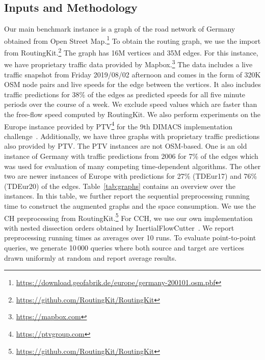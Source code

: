 \documentclass[manuscript,review]{acmart}
\begin{document}
\subsection{Inputs and Methodology}
Our main benchmark instance is a graph of the road network of Germany obtained from Open Street Map.\footnote{\url{https://download.geofabrik.de/europe/germany-200101.osm.pbf}}
To obtain the routing graph, we use the import from RoutingKit.\footnote{\url{https://github.com/RoutingKit/RoutingKit}}
The graph has 16M vertices and 35M edges.
For this instance, we have proprietary traffic data provided by Mapbox.\footnote{\url{https://mapbox.com}}
The data includes a live traffic snapshot from Friday 2019/08/02 afternoon and comes in the form of 320K OSM node pairs and live speeds for the edge between the vertices.
It also includes traffic predictions for 38\% of the edges as predicted speeds for all five minute periods over the course of a week.
We exclude speed values which are faster than the free-flow speed computed by RoutingKit.
We also perform experiments on the Europe instance provided by PTV\footnote{\url{https://ptvgroup.com}} for the 9th DIMACS implementation challenge~\cite{DemetrescuGJ09}.
Additionally, we have three graphs with proprietary traffic predictions also provided by PTV.
The PTV instances are not OSM-based.
One is an old instance of Germany with traffic predictions from 2006 for 7\% of the edges which was used for evaluation of many competing time-dependent algorithms.
The other two are newer instances of Europe with predictions for 27\% (TDEur17) and 76\% (TDEur20) of the edges.
Table~\ref{tab:graphs} contains an overview over the instances.
In this table, we further report the sequential preprocessing running time to construct the augmented graphs and the space consumption.
We use the CH preprocessing from RoutingKit.\footnote{\url{https://github.com/RoutingKit/RoutingKit}}
For CCH, we use our own implementation with nested dissection orders obtained by InertialFlowCutter~\cite{GottesburenHUW19}.
We report preprocessing running times as averages over 10 runs.
To evaluate point-to-point queries, we generate 10\,000 queries where both source and target are vertices drawn uniformly at random and report average results.

\begin{table}
\centering
\caption{
Instances used in the evaluation with preprocessing running times to construct (C)CH-Potentials.
With CCH-Potentials, $w_{\ell}$ can be updated by rerunning Phase 2 again.
}\label{tab:graphs}

\end{table}
\end{document}
